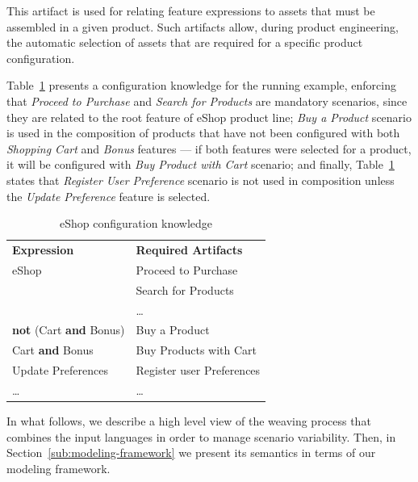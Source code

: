\documentclass{report}
\begin{document}
\begin{frontmatter}
This artifact is used for relating feature expressions to assets that must be assembled in a given product. Such artifacts allow, during product engineering, the automatic selection of assets that are required for a specific product configuration. 

Table~\ref{tab:ck-running-example} presents a configuration knowledge 
for the running example, enforcing that \emph{Proceed to Purchase} and 
\emph{Search for Products} are mandatory scenarios, since they are related 
to the root feature of eShop product line;  
\emph{Buy a Product} scenario is used in the composition of products that have not been configured with both \emph{Shopping Cart} and \emph{Bonus} features --- if both features were selected for a product, it will be configured with \emph{Buy Product with Cart} scenario; and finally, Table~\ref{tab:ck-running-example} states that \emph{Register User Preference} scenario is not used in composition unless the \emph{Update Preference} feature is selected.


\begin{table}[th]
\begin{center}
\nocaptionrule \caption{eShop configuration knowledge}
\label{tab:ck-running-example}
\begin{tabular}{ll}
   \hline\noalign{\smallskip}
  {\bf Expression} & {\bf Required Artifacts} \\
   \noalign{\smallskip}
   \hline
   \noalign{\smallskip}
    eShop & Proceed to Purchase \\
               & Search for Products \\
               & \ldots \\ 
    {\bf not} (Cart {\bf and} Bonus)\hspace{2pt} & Buy a Product \\ 
    Cart {\bf and} Bonus & Buy Products with Cart \\ 
    Update Preferences & Register user Preferences	 \\  
    \ldots & \ldots \\ 
  \hline
\end{tabular}
\end{center}
\end{table}

In what follows, we describe a high level view of the weaving process that combines the input languages in order to manage scenario variability.  Then, in Section~\ref{sub:modeling-framework} we present its semantics in terms of our modeling framework. 


\end{frontmatter}
\end{document}
